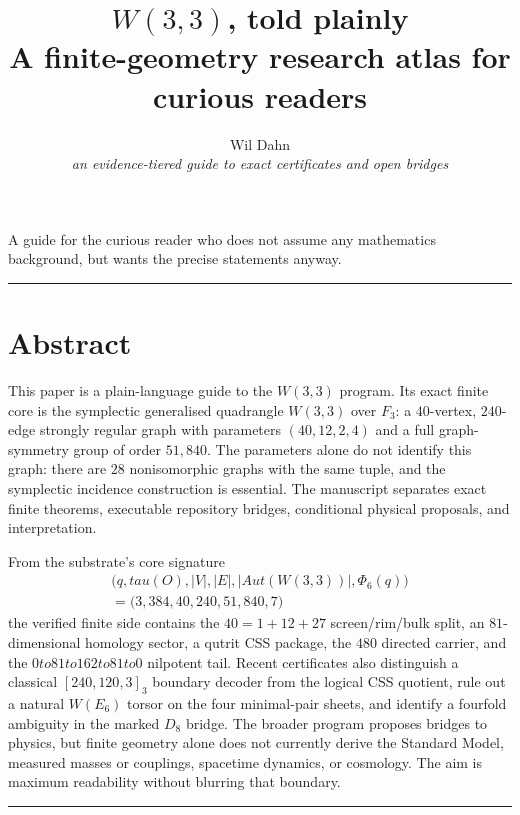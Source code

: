 \documentclass[11pt]{article}
\title{\Huge\bfseries $W(3,3)$, told plainly \\
\Large A finite-geometry research atlas for curious readers}
\author{Wil Dahn \\
\small \textit{an evidence-tiered guide to exact certificates and open bridges}}
\date{}
\def\mathbb#1{#1}%
\def\mathrm#1{#1}%
\def\textit#1{#1}%
\def\Phi#1{Phi#1}%
\def\tau{tau}%
\def\to{ to }%
\begin{document}
\maketitle

\begin{center}
\textit{A guide for the curious reader who does not assume any mathematics background, but wants the precise statements anyway.}
\end{center}

\vspace{1em}
\noindent\rule{0.98\linewidth}{0.4pt}
\vspace{1em}

\section*{Abstract}

This paper is a plain-language guide to the $W(3,3)$ program.  Its exact finite core is the symplectic generalised quadrangle $W(3,3)$ over $\mathbb{F}_3$: a $40$-vertex, $240$-edge strongly regular graph with parameters $(40,12,2,4)$ and a full graph-symmetry group of order $51{,}840$.  The parameters alone do not identify this graph: there are $28$ nonisomorphic graphs with the same tuple, and the symplectic incidence construction is essential.  The manuscript separates exact finite theorems, executable repository bridges, conditional physical proposals, and interpretation.

From the substrate's core signature
\[
\begin{gathered}
\bigl(q,\tau(O),|V|,|E|,|\mathrm{Aut}(W(3,3))|,\Phi_6(q)\bigr)\\
= \bigl(3,384,40,240,51{,}840,7\bigr)
\end{gathered}
\]
the verified finite side contains the $40=1+12+27$ screen/rim/bulk split, an $81$-dimensional homology sector, a qutrit CSS package, the $480$ directed carrier, and the $0\to81\to162\to81\to0$ nilpotent tail.  Recent certificates also distinguish a classical $[240,120,3]_3$ boundary decoder from the logical CSS quotient, rule out a natural $W(E_6)$ torsor on the four minimal-pair sheets, and identify a fourfold ambiguity in the marked $D_8$ bridge.  The broader program proposes bridges to physics, but finite geometry alone does not currently derive the Standard Model, measured masses or couplings, spacetime dynamics, or cosmology.  The aim is maximum readability without blurring that boundary.

\vspace{1em}
\noindent\rule{0.98\linewidth}{0.4pt}
\vspace{1em}
\end{document}

